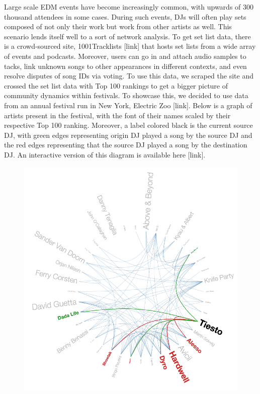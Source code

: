 \documentclass[12pt]{dalcsthesis}
\begin{document}
Large scale EDM events have become increasingly common, with upwards of 300 thousand attendees in some cases. During such events, DJs will often play sets composed of not only their work but work from other artists as well. This scenario lends itself well to a sort of network analysis. To get set list data, there is a crowd-sourced site, 1001Tracklists [link] that hosts set lists from a wide array of events and podcasts. Moreover, users can go in and attach audio samples to tacks, link unknown songs to other appearances in different contexts, and even resolve disputes of song IDs via voting. To use this data, we scraped the site and crossed the set list data with Top 100 rankings to get a bigger picture of community dynamics within festivals. To showcase this, we decided to use data from an annual festival run in New York, Electric Zoo [link]. Below is a graph of artists present in the festival, with the font of their names scaled by their respective Top 100 ranking. Moreover, a label colored black is the current source DJ, with green edges representing origin DJ played a song by the source DJ and the red edges representing that the source DJ played a song by the destination DJ. An interactive version of this diagram is available here [link]. 

\begin{figure}[h]
\includegraphics[scale=.7]{network_diagram}
\centering
\end{figure}
\end{document}
